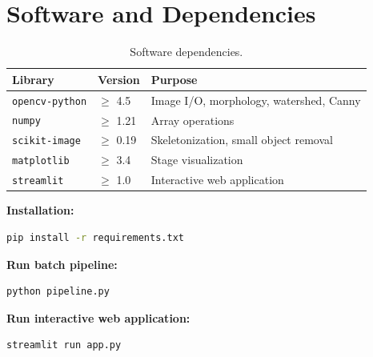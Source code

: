 \documentclass[12pt,a4paper]{article}
\newcommand{\code}[1]{\texttt{#1}}
\begin{document}
\section{Software and Dependencies}

\begin{table}[H]
    \centering
    \caption{Software dependencies.}
    \begin{tabular}{llp{7cm}}
        \toprule
        \textbf{Library} & \textbf{Version} & \textbf{Purpose} \\
        \midrule
        \code{opencv-python}  & $\geq$ 4.5 & Image I/O, morphology, watershed, Canny \\
        \code{numpy}          & $\geq$ 1.21 & Array operations \\
        \code{scikit-image}   & $\geq$ 0.19 & Skeletonization, small object removal \\
        \code{matplotlib}     & $\geq$ 3.4 & Stage visualization \\
        \code{streamlit}      & $\geq$ 1.0 & Interactive web application \\
        \bottomrule
    \end{tabular}
\end{table}

\textbf{Installation:}
\begin{lstlisting}[language=bash, style=pythonstyle]
pip install -r requirements.txt
\end{lstlisting}

\textbf{Run batch pipeline:}
\begin{lstlisting}[language=bash, style=pythonstyle]
python pipeline.py
\end{lstlisting}

\textbf{Run interactive web application:}
\begin{lstlisting}[language=bash, style=pythonstyle]
streamlit run app.py
\end{lstlisting}
\end{document}
